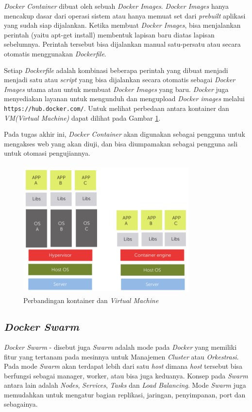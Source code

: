 		\indent \textit{Docker Container} dibuat oleh sebuah \textit{Docker Images}. \textit{Docker Images} hanya mencakup dasar dari operasi sistem atau hanya memuat set dari \textit{prebuilt} aplikasi yang sudah siap dijalankan. Ketika membuat \textit{Docker Images}, bisa menjalankan perintah (yaitu apt-get install) membentuk lapisan baru diatas lapisan sebelumnya. Perintah tersebut bisa dijalankan manual satu-persatu atau secara otomatis menggunakan \textit{Dockerfile}. 
		
		\indent Setiap \textit{Dockerfile} adalah kombinasi beberapa perintah yang dibuat menjadi menjadi satu atau \textit{script} yang bisa dijalankan secara otomatis sebagai \textit{Docker Images} utama atau untuk membuat \textit{Docker Images} yang baru\cite{docker}\cite{docker_2}. \textit{Docker} juga menyediakan layanan untuk mengunduh dan mengupload \textit{Docker images} melalui \texttt{https://hub.docker.com/}. Untuk melihat perbedaan antara kontainer dan \textit{VM(Virtual Machine)} dapat dilihat pada Gambar \ref{containervm}.
	
		\indent Pada tugas akhir ini, \textit{Docker Container} akan digunakan sebagai pengguna untuk mengakses web yang akan diuji, dan bisa diumpamakan sebagai pengguna asli untuk otomasi pengujiannya. \\
		
		\begin{figure}[H]
			\centering
			\includegraphics[width=9cm,height=7cm]{Images/C-2/containervm.png}
			\caption{Perbandingan kontainer dan \textit{Virtual Machine}\cite{docker_2}}
			\label{containervm}
		\end{figure}
	
		\subsection{\textit{Docker Swarm}}
			\textit{Docker Swarm} - disebut juga \textit{Swarm} adalah mode pada \textit{Docker} yang memiliki fitur yang tertanam pada mesinnya untuk Manajemen \textit{Cluster} atau \textit{Orkestrasi}. Pada mode \textit{Swarm} akan terdapat lebih dari satu \textit{host} dimana \textit{host} tersebut bisa berfungsi sebagai manager, worker, atau bisa juga keduanya. Konsep pada \textit{Swarm} antara lain adalah \textit{Nodes}, \textit{Services}, \textit{Tasks} dan \textit{Load Balancing}. Mode \textit{Swarm} juga memudahkan untuk mengatur bagian replikasi, jaringan, penyimpanan, port dan sebagainya.
			
